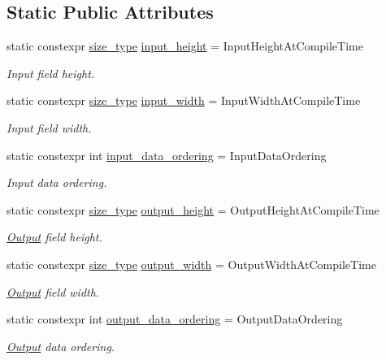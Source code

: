 \subsection*{Static Public Attributes}
\begin{DoxyCompactItemize}
\item 
static constexpr \hyperlink{namespaceffnn_a63b90a2fd70eb76684eac482a51633e5}{size\-\_\-type} \hyperlink{structffnn_1_1layer_1_1hidden_1_1options_ac51716b775a79ff9f7855a146e8bf0c3}{input\-\_\-height} = Input\-Height\-At\-Compile\-Time
\begin{DoxyCompactList}\small\item\em Input field height. \end{DoxyCompactList}\item 
static constexpr \hyperlink{namespaceffnn_a63b90a2fd70eb76684eac482a51633e5}{size\-\_\-type} \hyperlink{structffnn_1_1layer_1_1hidden_1_1options_a4567b834d82f7f709d014809b34ec8c4}{input\-\_\-width} = Input\-Width\-At\-Compile\-Time
\begin{DoxyCompactList}\small\item\em Input field width. \end{DoxyCompactList}\item 
static constexpr int \hyperlink{structffnn_1_1layer_1_1hidden_1_1options_acc5fb3b7db8c64263825566a0b9d4d02}{input\-\_\-data\-\_\-ordering} = Input\-Data\-Ordering
\begin{DoxyCompactList}\small\item\em Input data ordering. \end{DoxyCompactList}\item 
static constexpr \hyperlink{namespaceffnn_a63b90a2fd70eb76684eac482a51633e5}{size\-\_\-type} \hyperlink{structffnn_1_1layer_1_1hidden_1_1options_a331b0dddbc72d13f8b490bef82fe3b16}{output\-\_\-height} = Output\-Height\-At\-Compile\-Time
\begin{DoxyCompactList}\small\item\em \hyperlink{classffnn_1_1layer_1_1_output}{Output} field height. \end{DoxyCompactList}\item 
static constexpr \hyperlink{namespaceffnn_a63b90a2fd70eb76684eac482a51633e5}{size\-\_\-type} \hyperlink{structffnn_1_1layer_1_1hidden_1_1options_a1f31ac8402dd47157ea7dd8eba82c017}{output\-\_\-width} = Output\-Width\-At\-Compile\-Time
\begin{DoxyCompactList}\small\item\em \hyperlink{classffnn_1_1layer_1_1_output}{Output} field width. \end{DoxyCompactList}\item 
static constexpr int \hyperlink{structffnn_1_1layer_1_1hidden_1_1options_aca708d2c3dd945b311c4a00bfeb1976c}{output\-\_\-data\-\_\-ordering} = Output\-Data\-Ordering
\begin{DoxyCompactList}\small\item\em \hyperlink{classffnn_1_1layer_1_1_output}{Output} data ordering. \end{DoxyCompactList}\end{DoxyCompactItemize}


